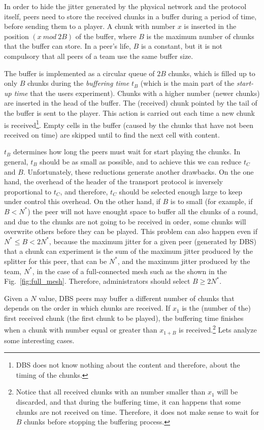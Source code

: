 
\label{sec:buffering_chunks}

In order to hide the jitter generated by the physical network and the
protocol itself, peers need to store the received chunks in a buffer
during a period of time, before sending them to a player. A chunk with
number $x$ is inserted in the position $(x~\mathit{mod}~2B)$ of the
buffer, where $B$ is the maximum number of chunks that the buffer can
store. In a peer's life, $B$ is a constant, but it is not compulsory
that all peers of a team use the same buffer size.

The buffer is implemented as a circular queue of $2B$ chunks, which is
filled up to only $B$ chunks during the \emph{buffering time} $t_B$
(which is the main part of the \emph{start-up time} that the users
experiment). Chunks with a higher number (newer chunks) are inserted
in the head of the buffer. The (received) chunk pointed by the tail of
the buffer is sent to the player. This action is carried out each time
a new chunk is received\footnote{DBS does not know nothing about the
  content and therefore, about the timing of the chunks.}. Empty cells
in the buffer (caused by the chunks that have not been received on
time) are skipped until to find the next cell with content.

$t_B$ determines how long the peers must wait for start playing the
chunks. In general, $t_B$ should be as small as possible, and to
achieve this we can reduce $t_C$ and $B$. Unfortunately, these
reductions generate another drawbacks. On the one hand, the overhead
of the header of the transport protocol is inversely proportional to
$t_C$, and therefore, $t_C$ should be selected enough large to keep
under control this overhead. On the other hand, if $B$ is to small
(for example, if $B<N^*$) the peer will not have enought space to
buffer all the chunks of a round, and due to the chunks are not going
to be received in order, some chunks will overwrite others before they
can be played. This problem can also happen even if $N^*\leq B<2N^*$,
because the maximum jitter for a given peer (generated by DBS) that a
chunk can experiment is the sum of the maximum jitter produced by the
splitter for this peer, that can be $N^*$, and the maximum jitter
produced by the team, $N^*$, in the case of a full-connected mesh such
as the shown in the Fig.~\ref{fig:full_mesh}. Therefore,
administrators should select $B\ge 2N^*$.

Given a $N$ value, DBS peers may buffer a different number of chunks
that depends on the order in which chunks are received. If $x_1$ is
the (number of the) first received chunk (the first chunk to be
played), the buffering time finishes when a chunk with number equal or
greater than $x_{1+B}$ is received.\footnote{Notice that all received
  chunks with an number smaller than $x_1$ will be discarded, and that
  during the buffering time, it can happens that some chunks are not
  received on time. Therefore, it does not make sense to wait for $B$
  chunks before stopping the buffering process.} Lets analyze some
interesting cases.

